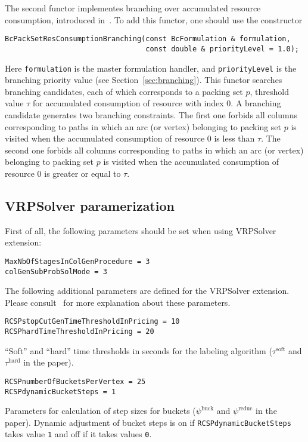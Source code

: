 \documentclass[10pt,a4paper]{article}
\begin{document}
The second functor implementes branching over accumulated resource consumption, introduced
in~\cite{PessoaSadykovUchoa:21f}. To add this functor, one should use the constructor
\begin{lstlisting}
BcPackSetResConsumptionBranching(const BcFormulation & formulation,
                                 const double & priorityLevel = 1.0);
\end{lstlisting}
Here \verb+formulation+ is the master formulation handler, and \verb+priorityLevel+ is the branching priority value (see
Section~\ref{sec:branching}).  This functor searches branching candidates, each of which corresponds to a packing set
$p$, threshold value $\tau$ for accumulated consumption of resource with index $0$. A branching candidate generates two
branching constraints. The first one forbids all columns corresponding to paths in which an arc (or vertex) belonging to
packing set $p$ is visited when the accumulated consumption of resource $0$ is less than $\tau$.  The second one forbids
all columns corresponding to paths in which an arc (or vertex) belonging to packing set $p$ is visited when the
accumulated consumption of resource $0$ is greater or equal to $\tau$.

\subsection{VRPSolver paramerization}

First of all, the following parameters should be set when using VRPSolver extension:
\begin{lstlisting}
MaxNbOfStagesInColGenProcedure = 3
colGenSubProbSolMode = 3
\end{lstlisting}

The following additional parameters are defined for the VRPSolver extension. Please
consult~\cite{PessoaSadykovUchoa:20a} for more explanation about these parameters.

\begin{lstlisting}
RCSPstopCutGenTimeThresholdInPricing = 10
RCSPhardTimeThresholdInPricing = 20
\end{lstlisting}
``Soft'' and ``hard'' time thresholds in seconds for the labeling algorithm ($\tau^{\mathrm{soft}}$ and
$\tau^{\mathrm{hard}}$ in the paper).

\begin{lstlisting}
RCSPnumberOfBucketsPerVertex = 25
RCSPdynamicBucketSteps = 1
\end{lstlisting}
Parameters for calculation of step sizes for buckets ($\psi^{\mathrm{buck}}$ and $\psi^{\mathrm{reduc}}$ in the
paper). Dynamic adjustment of bucket steps is on if \verb+RCSPdynamicBucketSteps+ takes value \verb+1+ and off if it
takes values \verb+0+.
\end{document}
